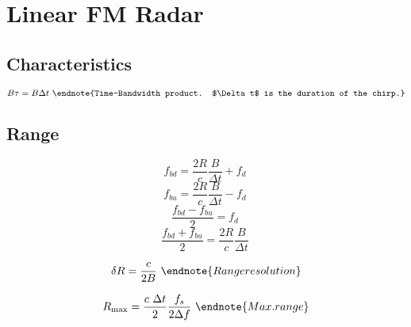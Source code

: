 \section{Linear FM Radar}

\subsection{Characteristics}
\begin{multicols}{3} \noindent
	$$ B \tau = B \Delta t \
		\endnote{Time-Bandwidth product. $\Delta t$ is the duration of the chirp.}
		$$
\end{multicols}

\subsection{Range}
\begin{multicols}{3} \noindent
	$$ f_{bd} = \frac{2R}{c} \frac{B}{\Delta t} + f_d \
		$$
	$$ f_{bu} = \frac{2R}{c} \frac{B}{\Delta t} - f_d \
		$$
	$$ \frac{f_{bd} - f_{bu}}{2} = f_d \
		$$
	$$ \frac{f_{bd} + f_{bu}}{2} = \frac{2R}{c} \frac{B}{\Delta t}\
		$$

	$$ \delta R = \frac{c}{2B} \
		\endnote{Range resolution}
		$$

	$$ R_\text{max} = \frac{c \ \Delta t}{2} \frac{f_s}{2 \Delta f} \
		\endnote{Max. range}
		$$

\end{multicols}


\printendnotes[itemize]

